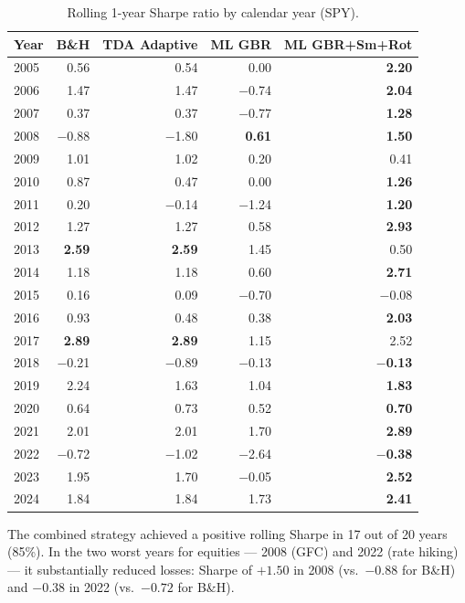 \documentclass[11pt, a4paper]{article}
\begin{document}
\begin{table}[H]
\centering
\caption{Rolling 1-year Sharpe ratio by calendar year (SPY).}
\label{tab:rolling}
\begin{tabular}{lrrrr}
\toprule
\textbf{Year} & \textbf{B\&H} & \textbf{TDA Adaptive} & \textbf{ML GBR} & \textbf{ML GBR+Sm+Rot} \\
\midrule
2005 &  0.56 &  0.54 &  0.00 & \textbf{2.20} \\
2006 &  1.47 &  1.47 & $-$0.74 & \textbf{2.04} \\
2007 &  0.37 &  0.37 & $-$0.77 & \textbf{1.28} \\
2008 & $-$0.88 & $-$1.80 &  \textbf{0.61} & \textbf{1.50} \\
2009 &  1.01 &  1.02 &  0.20 &  0.41 \\
2010 &  0.87 &  0.47 &  0.00 & \textbf{1.26} \\
2011 &  0.20 & $-$0.14 & $-$1.24 & \textbf{1.20} \\
2012 &  1.27 &  1.27 &  0.58 & \textbf{2.93} \\
2013 & \textbf{2.59} & \textbf{2.59} &  1.45 &  0.50 \\
2014 &  1.18 &  1.18 &  0.60 & \textbf{2.71} \\
2015 &  0.16 &  0.09 & $-$0.70 & $-$0.08 \\
2016 &  0.93 &  0.48 &  0.38 & \textbf{2.03} \\
2017 & \textbf{2.89} & \textbf{2.89} &  1.15 &  2.52 \\
2018 & $-$0.21 & $-$0.89 & $-$0.13 & \textbf{$-$0.13} \\
2019 &  2.24 &  1.63 &  1.04 & \textbf{1.83} \\
2020 &  0.64 &  0.73 &  0.52 & \textbf{0.70} \\
2021 &  2.01 &  2.01 &  1.70 & \textbf{2.89} \\
2022 & $-$0.72 & $-$1.02 & $-$2.64 & \textbf{$-$0.38} \\
2023 &  1.95 &  1.70 & $-$0.05 & \textbf{2.52} \\
2024 &  1.84 &  1.84 &  1.73 & \textbf{2.41} \\
\bottomrule
\end{tabular}
\end{table}

The combined strategy achieved a positive rolling Sharpe in 17 out of 20 years (85\%). In the two worst years for equities --- 2008 (GFC) and 2022 (rate hiking) --- it substantially reduced losses: Sharpe of $+1.50$ in 2008 (vs.\ $-0.88$ for B\&H) and $-0.38$ in 2022 (vs.\ $-0.72$ for B\&H).
\end{document}
